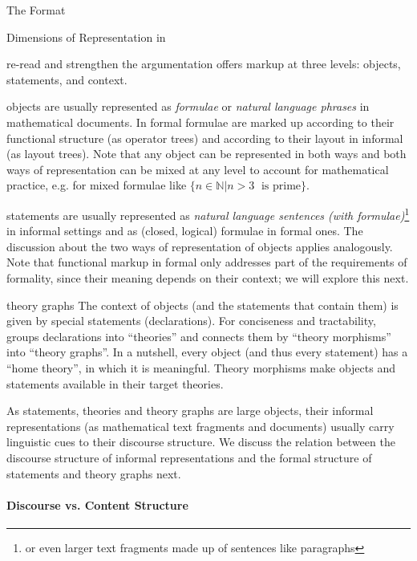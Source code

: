 \begin{omgroup}[creators=miko,id=spec-intro]{The \omdoc Format}
\begin{omgroup}[id=syntax-semantics]{Dimensions of Representation in \omdoc}
\begin{newpart}{re-read and strengthen the argumentation}
\omdoc offers markup at three levels: objects, statements, and context.
\begin{compactdesc}
\item[objects] are usually represented as {\emph{formulae}} or \emph{natural language
    phrases} in mathematical documents. In formal \omdoc formulae are marked up according
  to their functional structure (as operator trees) and according to their layout in
  informal \omdoc (as layout trees). Note that any object can be represented in both ways
  and both ways of representation can be mixed at any level to account for mathematical
  practice, e.g. for mixed formulae like $\{n\in\mathbb{N}\bigl|n>3 \;\text{ is prime}\}$.
\item[statements] are usually represented as \emph{natural language sentences (with
    formulae)}\footnote{or even larger text fragments made up of sentences like
    paragraphs} in informal settings and as (closed, logical) formulae in formal ones. The
  discussion about the two ways of representation of objects applies analogously. Note
  that functional markup in formal \omdoc only addresses part of the requirements of
  formality, since their meaning depends on their context; we will explore this next.
\item[theory graphs] The context of objects (and the statements that contain them) is
  given by special statements (declarations). For conciseness and tractability, \omdoc
  groups declarations into ``theories'' and connects them by ``theory morphisms'' into
  ``theory graphs''. In a nutshell, every object (and thus every statement) has a ``home
  theory'', in which it is meaningful. Theory morphisms make objects and statements
  available in their target theories.
\end{compactdesc}
As statements, theories and theory graphs are large objects, their informal
representations (as mathematical text fragments and documents) usually carry linguistic
cues to their discourse structure. We discuss
the relation between the discourse structure of informal representations and the formal
structure of statements and theory graphs next.

\paragraph{Discourse vs. Content Structure}


\end{newpart}
\end{omgroup}
\end{omgroup}
